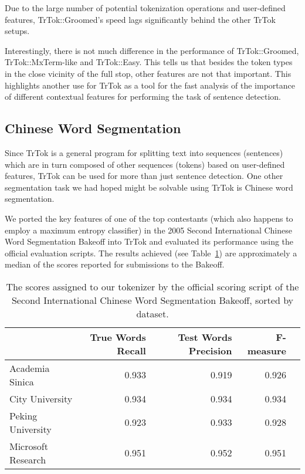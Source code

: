 Due to the large number of potential tokenization operations and
user-defined features, TrTok::Groomed's speed lags significantly
behind the other TrTok setups.

Interestingly, there is not much difference in the performance of
TrTok::Groomed, TrTok::MxTerm-like and TrTok::Easy. This tells us that
besides the token types in the close vicinity of the full stop, other
features are not that important. This highlights another use for TrTok
as a tool for the fast analysis of the importance of different
contextual features for performing the task of sentence detection.

\subsection{Chinese Word Segmentation}

Since TrTok is a general program for splitting text into sequences
(sentences) which are in turn composed of other sequences (tokens)
based on user-defined features, TrTok can be used for more than just
sentence detection. One other segmentation task we had hoped might be
solvable using TrTok is Chinese word segmentation.

We ported the key features of one of the top contestants (which also
happens to employ a maximum entropy classifier)
\cite{seg-chinese-maxent} in the 2005 Second International Chinese
Word Segmentation Bakeoff into TrTok and evaluated its performance
using the official evaluation scripts. The results achieved (see
Table~\ref{tbl:bakeoff-score}) are approximately a median of the
scores reported for submissions to the Bakeoff.

\begin{table}
  \small
  \begin{center}
    \begin{tabular}{ | l | r | r | r | r | }
      \hline
      & True Words Recall & Test Words Precision & F-measure \\ \hline
      Academia Sinica & 0.933 & 0.919 & 0.926 \\ \hline
      City University & 0.934 & 0.934 & 0.934 \\ \hline
      Peking University & 0.923 & 0.933 & 0.928 \\ \hline
      Microsoft Research & 0.951 & 0.952 & 0.951 \\
      \hline
    \end{tabular}
  \end{center}
  \caption[Chinese Word Segmentation scores]
    {The scores assigned to our tokenizer by the official scoring script of the
    Second International Chinese Word Segmentation Bakeoff, sorted by dataset.}
  \label{tbl:bakeoff-score}
\end{table}

